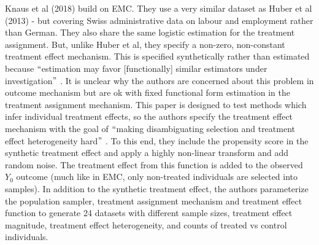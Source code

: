 \documentclass[../main.tex]{subfiles}
\begin{document}
\vspace{\baselineskip}
Knaus et al (2018) build on EMC. They use a very similar dataset as Huber et al (2013) - but covering Swiss administrative data on labour and employment rather than German. They also share the same logistic estimation for the treatment assignment. But, unlike Huber et al, they specify a non-zero, non-constant treatment effect mechanism. This is specified synthetically rather than estimated because $``$estimation may favor [functionally] similar estimators under investigation$"$ . It is unclear why the authors are concerned about this problem in outcome mechanism but are ok with fixed functional form estimation in the treatment assignment mechanism. This paper is designed to test methods which infer individual treatment effects, so the authors specify the treatment effect mechanism with the goal of $``$making disambiguating selection and treatment effect heterogeneity hard$"$ . To this end, they include the propensity score in the synthetic treatment effect and apply a highly non-linear transform and add random noise. The treatment effect from this function is added to the observed  \( Y_{0} \) outcome (much like in EMC, only non-treated individuals are selected into samples). In addition to the synthetic treatment effect, the authors parameterize the population sampler, treatment assignment mechanism and treatment effect function to generate 24 datasets with different sample sizes, treatment effect magnitude, treatment effect heterogeneity, and counts of treated vs control individuals.\par


\vspace{\baselineskip}

\vspace{\baselineskip}


\end{document}
